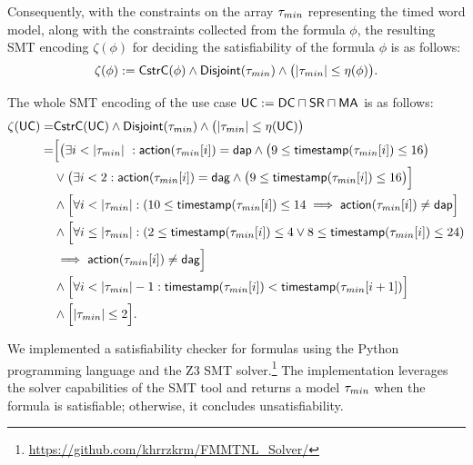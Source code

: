 Consequently, with the constraints on the array $\tau_{min}$ representing the timed word model, along with the constraints collected from the formula $\phi$, the resulting SMT encoding $\zeta(\phi)$ for deciding the satisfiability of the formula $\phi$ is as follows:
\[
\zeta(\phi) := \mathsf{CstrC}(\phi) \wedge {\ensuremath{\mathsf{Disjoint}}}(\tau_{min}) \wedge \big(\vert \tau_{min}\vert \leq \eta(\phi)\big).
\]

\begin{example}
    The whole SMT encoding of the  use case $\mathsf{UC}:=\mathsf{DC} \sqcap \mathsf{SR} \sqcap \mathsf{MA}$ is as follows:
    \begin{align*}
    \zeta(\mathsf{UC})=& \mathsf{CstrC}(\mathsf{UC}) \wedge {\ensuremath{\mathsf{Disjoint}}} (\tau_{min}) \wedge \big(\vert \tau_{min}\vert \leq \eta(\mathsf{UC})\big)
    \\=&\Big[\big(\exists i < \vert \tau_{min}\vert\ : {\mathsf{action}}(\tau_{min}[i]) = \mathsf{dap} \wedge \big( 9 \leq {\ensuremath{\mathsf{timestamp}}}(\tau_{min}[i]) \leq 16\big)\\ &
    \vee \big(\exists i < 2 : {\mathsf{action}}(\tau_{min}[i]) = \mathsf{dag} \wedge \big(9 \leq {\ensuremath{\mathsf{timestamp}}}(\tau_{min}[i]) \leq 16\big)\Big]
\\& \wedge \Big[\forall i < \vert \tau_{min}\vert: (10 \leq{\ensuremath{\mathsf{timestamp}}}(\tau_{min}[i]) \leq 14  \implies {\ensuremath{\mathsf{action}}}(\tau_{min}[i]) \neq \mathsf{dap}\Big]
    \\& \wedge \Big[\forall i \leq \vert \tau_{min}\vert: (2 \leq{\ensuremath{\mathsf{timestamp}}}(\tau_{min}[i]) \leq 4 \vee 8 \leq {\ensuremath{\mathsf{timestamp}}}(\tau_{min}[i]) \leq 24 )\\&
     \implies {\ensuremath{\mathsf{action}}}(\tau_{min}[i]) \neq \mathsf{dag}\Big]
    \\& \wedge \Big[\forall i < \vert \tau_{min}\vert-1: {\mathsf{timestamp}}(\tau_{min}[i]) < {\mathsf{timestamp}}(\tau_{min}[i+1]) \Big]\\&\wedge \Big[\vert \tau_{min}\vert \leq 2\Big].
    \end{align*} 
\end{example}


We implemented a satisfiability checker for \TDDLfm formulas using the Python programming language and the Z3 SMT solver.\footnote{\href{https://github.com/khrrzkrm/FMMTNL\_Solver}{https://github.com/khrrzkrm/FMMTNL\_Solver/}} The implementation leverages the solver capabilities of the SMT tool and returns a model $\tau_{min}$ when the formula is satisfiable; otherwise, it concludes unsatisfiability.

